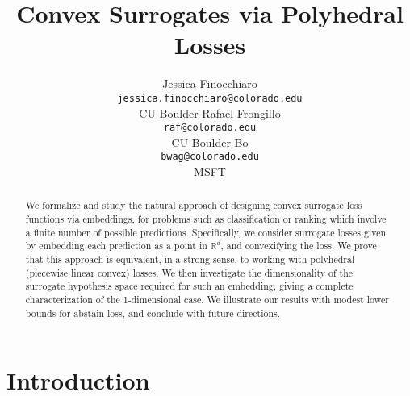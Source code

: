 \documentclass[12pt]{article}
\title{Convex Surrogates via Polyhedral Losses}
\author{%
 Jessica Finocchiaro\raf{Jessie?} \\
 \texttt{jessica.finocchiaro@colorado.edu}\\
 CU Boulder
 \And
 Rafael Frongillo\\
 \texttt{raf@colorado.edu}\\
 CU Boulder
 \And
 Bo\\
 \texttt{bwag@colorado.edu}\\
 MSFT
}
\newcommand{\Comments}{1}
\newcommand{\mynote}[2]{\ifnum\Comments=1\textcolor{#1}{#2}\fi}
\newcommand{\raf}[1]{\mynote{green}{[RF: #1]}}
\newcommand{\reals}{\mathbb{R}}
\newcommand{\R}{\mathcal{R}}
\begin{document}
\maketitle

\begin{abstract}
  We formalize and study the natural approach of designing convex surrogate loss functions via embeddings, for problems such as classification or ranking which involve a finite number of possible predictions.
  Specifically, we consider surrogate losses given by embedding each prediction as a point in $\reals^d$, and convexifying the loss.
  We prove that this approach is equivalent, in a strong sense, to working with polyhedral (piecewise linear convex) losses.
  We then investigate the dimensionality of the surrogate hypothesis space required for such an embedding, giving a complete characterization of the 1-dimensional case.
  We illustrate our results with modest lower bounds for abstain loss, and conclude with future directions.
\end{abstract}
  


\section{Introduction}\label{sec:intro}

%
\end{document}
